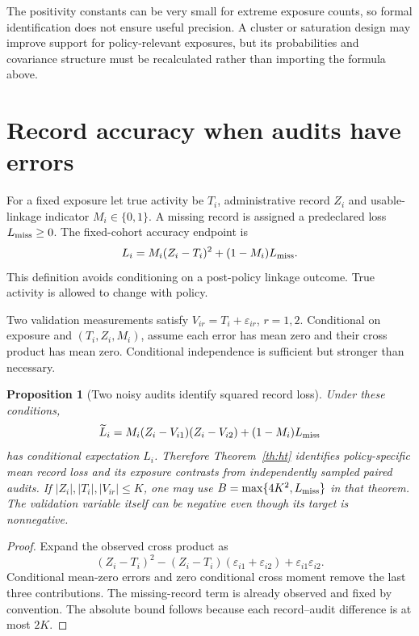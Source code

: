 \documentclass[11pt,a4paper]{article}
\newtheorem{proposition}[theorem]{Proposition}
\theoremstyle{definition}
\theoremstyle{remark}
\begin{document}
The positivity constants can be very small for extreme exposure counts, so formal identification does not ensure useful precision. A cluster or saturation design may improve support for policy-relevant exposures, but its probabilities and covariance structure must be recalculated rather than importing the formula above.

\section{Record accuracy when audits have errors}
For a fixed exposure let true activity be $T_i$, administrative record $Z_i$ and usable-linkage indicator $M_i\in\{0,1\}$. A missing record is assigned a predeclared loss $L_{\rm miss}\geq0$. The fixed-cohort accuracy endpoint is
\[
 L_i=M_i(Z_i-T_i)^2+(1-M_i)L_{\rm miss}.
\]
This definition avoids conditioning on a post-policy linkage outcome. True activity is allowed to change with policy.

Two validation measurements satisfy $V_{ir}=T_i+\varepsilon_{ir}$, $r=1,2$. Conditional on exposure and $(T_i,Z_i,M_i)$, assume each error has mean zero and their cross product has mean zero. Conditional independence is sufficient but stronger than necessary.

\begin{proposition}[Two noisy audits identify squared record loss]\label{pr:audit}
Under these conditions,
\[
 \widetilde L_i=M_i(Z_i-V_{i1})(Z_i-V_{i2})
                 +(1-M_i)L_{\rm miss}
\]
has conditional expectation $L_i$. Therefore Theorem~\ref{th:ht} identifies policy-specific mean record loss and its exposure contrasts from independently sampled paired audits. If $|Z_i|,|T_i|,|V_{ir}|\leq K$, one may use
$B=\max\{4K^2,L_{\rm miss}\}$ in that theorem. The validation variable itself can be negative even though its target is nonnegative.
\end{proposition}
\begin{proof}
Expand the observed cross product as
\[
 (Z_i-T_i)^2-(Z_i-T_i)(\varepsilon_{i1}+\varepsilon_{i2})
                    +\varepsilon_{i1}\varepsilon_{i2}.
\]
Conditional mean-zero errors and zero conditional cross moment remove the last three contributions. The missing-record term is already observed and fixed by convention. The absolute bound follows because each record--audit difference is at most $2K$.
\end{proof}
\end{document}
